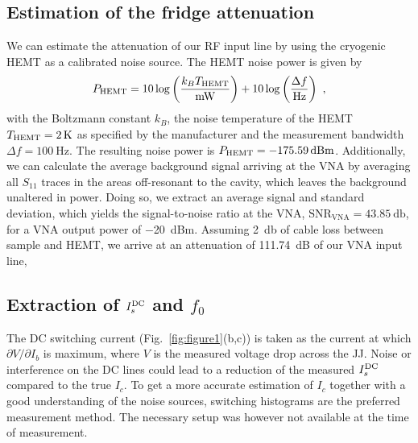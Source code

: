 \subsection{Estimation of the fridge attenuation}\label{sec:attenuation}

We can estimate the attenuation of our RF input line by using the cryogenic HEMT as a calibrated noise source.
%
The HEMT noise power is given by
%
\begin{align}
P_{\rm HEMT}=10\log\left(\frac{k_B T_{\rm HEMT}}{\si{\milli\watt}}\right) + 10\log\left(\frac{\Delta f}{\si{\hertz}}\right)\ ,
\label{eq:HEMT}
\end{align}
%
with the Boltzmann constant $k_B$, the noise temperature of the HEMT $T_{\rm HEMT}=\SI{2}{\kelvin}$ as specified by the manufacturer and the measurement bandwidth $\Delta f=\SI{100}{\hertz}$.
%
The resulting noise power is $P_{\rm HEMT}=\SI{-175.59}{dBm}$.
%
Additionally, we can calculate the average background signal arriving at the VNA by averaging all $S_{11}$ traces in the areas off-resonant to the cavity, which leaves the background unaltered in power.
%
Doing so, we extract an average signal and standard deviation, which yields the signal-to-noise ratio at the VNA, $\text{SNR}_\text{VNA}=\SI{43.85}{\decibel}$, for a VNA output power of \SI{-20}{dBm}.
%
Assuming \SI{2}{\decibel} of cable loss between sample and HEMT, we arrive at an attenuation of \SI{111.74}{dB} of our VNA input line,

\subsection{Extraction of $I_s^{\rm DC}$ and $f_0$}\label{sec:extraction}

The DC switching current (Fig.~\ref{fig:figure1}(b,c)) is taken as the current at which $\partial V/\partial I_b$ is maximum, where $V$ is the measured voltage drop across the JJ.
%
Noise or interference on the DC lines could lead to a reduction of the measured $I_s^{\rm DC}$ compared to the true $I_c$.
%
To get a more accurate estimation of $I_c$ together with a good understanding of the noise sources, switching histograms are the preferred measurement method.
%
The necessary setup was however not available at the time of measurement.


